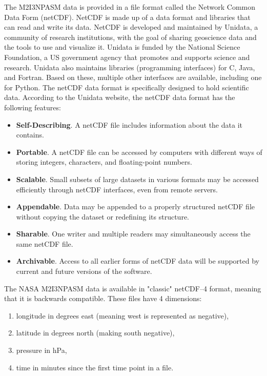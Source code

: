 \documentclass[../00_main.tex]{subfiles}
\begin{document}
The M2I3NPASM data is provided in a file format called the Network Common Data 
Form 
(netCDF). NetCDF is made up of a data format and libraries that can read and
write its data. 
NetCDF is developed and maintained by Unidata, a community of
research institutions, with the goal of sharing geoscience data and the tools
to use and visualize it. 
Unidata is funded by the National Science Foundation,
a US government agency that promotes and supports science and research.
Unidata also maintains libraries (programming interfaces) for C, Java, and
Fortran. Based on these, multiple other interfaces are available, including one
for Python.\newline
The netCDF data format is specifically designed to hold scientific data.
According to the Unidata website, the netCDF data format has the following
features:
\begin{itemize}
    \item \textbf{Self-Describing}. A netCDF file includes information about 
        the data it contains.
    \item \textbf{Portable}. A netCDF file can be accessed by computers with 
        different ways of storing integers, characters, and floating-point 
        numbers.
    \item \textbf{Scalable}. Small subsets of large datasets in various formats 
        may be accessed efficiently through netCDF interfaces, even from remote 
        servers.
    \item \textbf{Appendable}. Data may be appended to a properly structured 
        netCDF file without copying the dataset or redefining its structure.
    \item \textbf{Sharable}. One writer and multiple readers may simultaneously 
        access the same netCDF file.
    \item \textbf{Archivable}. Access to all earlier forms of netCDF data will 
        be supported by current and future versions of the software.
\end{itemize}
The NASA M2I3NPASM data is available in "classic" netCDF--4 format, meaning that
it is backwards compatible. These files have 4 dimensions:
\begin{enumerate}
    \item longitude in degrees east (meaning west is represented as negative),
    \item latitude in degrees north (making south negative),
    \item pressure in hPa,
    \item time in minutes since the first time point in a file.
\end{enumerate}
\end{document}
